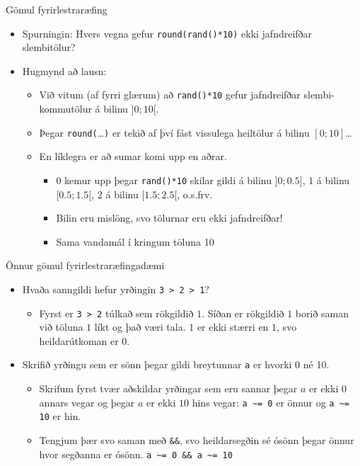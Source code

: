 \documentclass[handout]{beamer}
\begin{document}
\begin{frame}{Gömul fyrirlestraræfing}
\begin{itemize}
 \item Spurningin: Hvers vegna gefur \texttt{round(rand()*10)} ekki jafndreifðar slembitölur? \pause
 \item Hugmynd að lausn:
 \begin{itemize}
  \item Við vitum (af fyrri glærum) að \texttt{rand()*10} gefur jafndreifðar slembi-kommutölur á bilinu $]0;10[$.
  \item Þegar \texttt{round(}\ldots\texttt{)} er tekið af því fást vissulega heiltölur á bilinu $[0;10]$\ldots
  \item En líklegra er að sumar komi upp en aðrar.
  \begin{itemize}
   \item $0$ kemur upp þegar \texttt{rand()*10} skilar gildi á bilinu $]0;0.5]$, $1$ á bilinu $[0.5;1.5[$, $2$ á bilinu $[1.5;2.5[$, o.s.frv.
   \item Bilin eru mislöng, svo tölurnar eru ekki jafndreifðar!
   \item Sama vandamál í kringum töluna 10
  \end{itemize}
 \end{itemize}
\end{itemize}
\end{frame}

\begin{frame}{Önnur gömul fyrirlestraræfingadæmi}
\begin{itemize}
 \item Hvaða sanngildi hefur yrðingin \texttt{3 > 2 > 1}?\pause
 \begin{itemize}
  \item Fyrst er \texttt{3 > 2} túlkað sem rökgildið $1$. Síðan er rökgildið $1$ borið saman við töluna $1$ líkt og það væri tala. $1$ er ekki stærri en $1$, svo heildarútkoman er $0$.
 \end{itemize} \pause
 \item Skrifið yrðingu sem er sönn þegar gildi breytunnar \texttt{a} er hvorki 0 né 10. \pause
 \begin{itemize}
  \item Skrifum fyrst tvær aðskildar yrðingar sem eru sannar þegar $a$ er ekki $0$ annars vegar og þegar $a$ er ekki $10$ hins vegar: \texttt{a \~{}= 0} er önnur og \texttt{a \~{}= 10} er hin.
  \item Tengjum þær svo saman með \texttt{\&\&}, svo heildarsegðin sé ósönn þegar önnur hvor segðanna er ósönn. \texttt{a \~{}= 0 \&\& a \~{}= 10}
 \end{itemize}
\end{itemize}
\end{frame}
\end{document}
